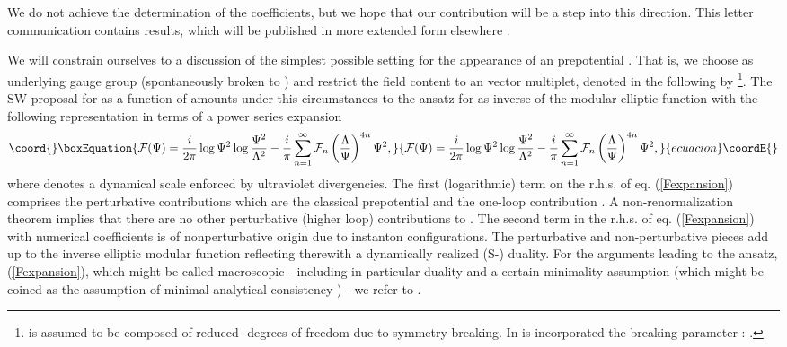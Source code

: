 \documentclass[a4paper,12pt]{article}
\begin{document}
We do not achieve the determination of the coefficients, 
but we hope that our contribution will be a step into this direction. 
This letter communication contains results, which will be published 
in more extended form elsewhere \cite{fps}.  

We will constrain ourselves to a discussion of the simplest 
possible setting for the appearance of an \coordHE{} prepotential 
\coordHE{}. 
That is, we choose \coordHE{} as underlying gauge group (spontaneously 
broken to \coordHE{}) and restrict the field content to an \coordHE{} 
vector multiplet, denoted in the following by \myHighlight{$\Psi$}\coordHE{} \footnote{\myHighlight{$\Psi$}\coordHE{} 
is assumed to be composed of 
reduced \coordHE{}-degrees of freedom due to symmetry breaking. In \myHighlight{$\Psi$}\coordHE{} is 
incorporated the breaking parameter \coordHE{} : \coordHE{}.}. 
The SW proposal for \coordHE{} as a function of \myHighlight{$\Psi$}\coordHE{} amounts 
under this circumstances to the ansatz for \coordHE{} as inverse of 
the  modular elliptic function \coordHE{} \cite{erdelyi} with the following 
representation in terms of a power series expansion
\begin{equation}\coord{}\boxEquation{
{\cal F}(\Psi)=\frac{i}{2\pi} \log \Psi^2\log \frac{\Psi^2}{\Lambda^2} 
-\frac{i}{\pi}\sum_{n=1}^{\infty}{\cal F}_n \left(\frac{\Lambda}{\Psi}
\right)^{4n} \Psi^2, 
\label{Fexpansion}
}{
{\cal F}(\Psi)=\frac{i}{2\pi} \log \Psi^2\log \frac{\Psi^2}{\Lambda^2} 
-\frac{i}{\pi}\sum_{n=1}^{\infty}{\cal F}_n \left(\frac{\Lambda}{\Psi}
\right)^{4n} \Psi^2, 
}{ecuacion}\coordE{}\end{equation}   
where \myHighlight{$\Lambda$}\coordHE{} denotes a dynamical scale enforced by ultraviolet 
divergencies. The first (logarithmic) term on the r.h.s. of eq. 
(\ref{Fexpansion}) comprises the perturbative contributions which 
are the classical prepotential \myHighlight{$\sim$}\coordHE{}  \coordHE{} and the one-loop 
contribution \myHighlight{$\sim$}\coordHE{}  \coordHE{}. A non-renormalization 
theorem \cite{s2} implies that there are no other perturbative 
(higher loop) contributions to \coordHE{}. 
The second term in the r.h.s. of eq. (\ref{Fexpansion}) with 
numerical coefficients \coordHE{} is of nonperturbative origin 
due to instanton configurations. The perturbative and non-perturbative 
pieces add up to the inverse elliptic modular function reflecting 
therewith a dynamically realized (S-) duality. For the arguments 
leading to the ansatz, (\ref{Fexpansion}), which might be called 
macroscopic - including in particular duality and a certain 
minimality assumption (which might be coined as the assumption of minimal 
analytical consistency \cite{flume}) - 
we refer to \cite{sw1}. 
\end{document}

